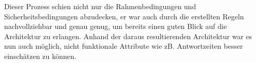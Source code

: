 Dieser Prozess schien nicht nur die Rahmenbedingungen und Sicherheitsbedingungen abzudecken, er war auch durch die erstellten Regeln nachvollziehbar und genau genug, um bereits einen guten Blick auf die Architektur zu erlangen. Anhand der daraus resultierenden Architektur war es nun auch möglich, nicht funktionale Attribute wie zB. Antwortzeiten besser einschätzen zu können.
